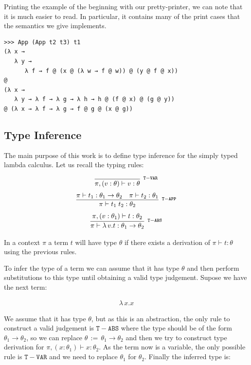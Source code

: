 \documentclass[a4paper,10pt]{article}
\newcommand{\typejud}[3] {
  \ensuremath{#1 \vdash #2 : #3}
}
\begin{document}
Printing the example of the beginning with our pretty-printer, we can note that it is much easier 
to read. In particular, it contains many of the print cases that the semantics we give implements.

\begin{verbatim}
>>> App (App t2 t3) t1
(λ x →
   λ y →
      λ f → f @ (x @ (λ w → f @ w)) @ (y @ f @ x))
@
(λ x →
   λ y → λ f → λ g → λ h → h @ (f @ x) @ (g @ y))
@ (λ x → λ f → λ g → f @ g @ (x @ g))
\end{verbatim}

\subsection{Type Inference}


 The main purpose of this work is to define type inference for the simply typed 
 lambda calculus. Let us recall the typing rules:
 
 \begin{align*}
 \infer[^{\mathtt{T-VAR}}]
       {\typejud{\pi,(v:\theta)}{v}{\theta}}
       {}
 \end{align*}
  \begin{align*}
  \infer[^{\mathtt{T-APP}}]
       {\typejud{\pi}{t_1\;t_2}{\theta_2}}
       {\typejud{\pi}{t_1}{\theta_1\rightarrow\theta_2} &
        \typejud{\pi}{t_2}{\theta_1}
       }
  \end{align*}
  \begin{align*}
  \infer[^{\mathtt{T-ABS}}]
       {\typejud{\pi}{\lambda\,v.t}{\theta_1 \rightarrow \theta_2}}
       {\typejud{\pi,(v:\theta_1)}{t}{\theta_2}
       }
  \end{align*}
 
 In a context $\pi$ a term $t$ will have type $\theta$ if there exists a derivation of
 $\typejud{\pi}{t}{\theta}$ using the previous rules.
 
 To infer the type of a term we can assume that it has type $\theta$ and then perform substitutions
 to this type until obtaining a valid type judgement. Supose we have the next term:
 
 \begin{align*}
    \lambda\,x.x
 \end{align*}

 We assume that it has type $\theta$, but as this is an abstraction, the only rule to construct a valid
 judgement is $\mathtt{T-ABS}$ where the type should be of the form $\theta_1 \rightarrow \theta_2$,
 so we can replace $\theta\,:=\,\theta_1 \rightarrow \theta_2$ and then we try to construct type derivation for
 $\typejud{\pi,(x:\theta_1)}{x}{\theta_2}$. As the term now is a variable, the only possible rule
 is $\mathtt{T-VAR}$ and we need to replace $\theta_1$ for $\theta_2$. Finally the inferred type is:
 
\end{document}
